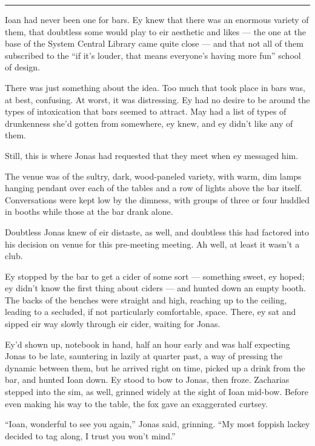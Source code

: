 \begin{center}\rule{0.5\linewidth}{0.5pt}\end{center}

Ioan had never been one for bars. Ey knew that there was an enormous variety of them, that doubtless some would play to eir aesthetic and likes — the one at the base of the System Central Library came quite close — and that not all of them subscribed to the ``if it's louder, that means everyone's having more fun'' school of design.

There was just something about the idea. Too much that took place in bars was, at best, confusing. At worst, it was distressing. Ey had no desire to be around the types of intoxication that bars seemed to attract. May had a list of types of drunkenness she'd gotten from somewhere, ey knew, and ey didn't like any of them.

Still, this is where Jonas had requested that they meet when ey messaged him.

The venue was of the sultry, dark, wood-paneled variety, with warm, dim lamps hanging pendant over each of the tables and a row of lights above the bar itself. Conversations were kept low by the dimness, with groups of three or four huddled in booths while those at the bar drank alone.

Doubtless Jonas knew of eir distaste, as well, and doubtless this had factored into his decision on venue for this pre-meeting meeting. Ah well, at least it wasn't a club.

Ey stopped by the bar to get a cider of some sort — something sweet, ey hoped; ey didn't know the first thing about ciders — and hunted down an empty booth. The backs of the benches were straight and high, reaching up to the ceiling, leading to a secluded, if not particularly comfortable, space. There, ey sat and sipped eir way slowly through eir cider, waiting for Jonas.

Ey'd shown up, notebook in hand, half an hour early and was half expecting Jonas to be late, sauntering in lazily at quarter past, a way of pressing the dynamic between them, but he arrived right on time, picked up a drink from the bar, and hunted Ioan down. Ey stood to bow to Jonas, then froze. Zacharias stepped into the sim, as well, grinned widely at the sight of Ioan mid-bow. Before even making his way to the table, the fox gave an exaggerated curtsey.

``Ioan, wonderful to see you again,'' Jonas said, grinning. ``My most foppish lackey decided to tag along, I trust you won't mind.''

